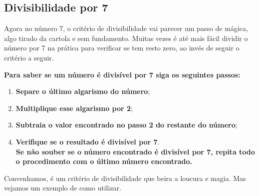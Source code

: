 \subsection{Divisibilidade por 7}

Agora no número 7, o critério de divisibilidade vai parecer um passo de mágica, algo tirado da cartola e sem fundamento. Muitas vezes é até mais fácil dividir o número por 7 na prática para verificar se tem resto zero, ao invés de seguir o critério a seguir.

\textbf{Para saber se um número é divisível por 7 siga os seguintes passos:}

\begin{enumerate}
    \item \textbf{Separe o último algarismo do número};
    \item \textbf{Multiplique esse algarismo por 2};
    \item \textbf{Subtraia o valor encontrado no passo 2 do restante do número};
    \item \textbf{Verifique se o resultado é divisível por 7}.\\
    
    \textbf{Se não souber se o número encontrado é divisível por 7, repita todo o procedimento com o último número encontrado.}
\end{enumerate}

Convenhamos, é um critério de divisibilidade que beira a loucura e magia. Mas vejamos um exemplo de como utilizar.

